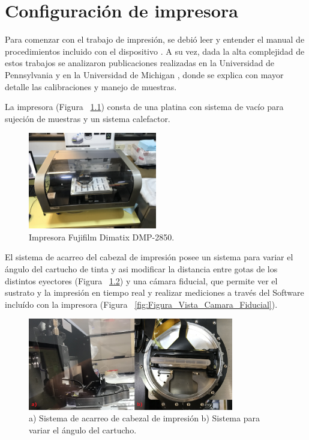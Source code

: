 \chapter{Configuración de impresora}\label{chap:apendiceA}
Para comenzar con el trabajo de impresión, se debió leer y entender el manual de procedimientos incluido con el dispositivo \cite{DimatixUM}. A su vez, dada la alta complejidad de estos trabajos se analizaron publicaciones realizadas en la Universidad de Pennsylvania \cite{UPenn} y en la Universidad de Michigan \cite{UMic}, donde se explica con mayor detalle las calibraciones y manejo de muestras.

La impresora (Figura ~\ref{fig:Figura_Impresora_DMP2850}) consta de una platina con sistema de vacío para sujeción de muestras y un sistema calefactor. 

\begin{figure}[H]
  \centering
    \includegraphics[width=0.5\textwidth]{Figuras/Figura_Impresora_DMP2850}
  \caption{Impresora Fujifilm Dimatix DMP-2850.}
  \label{fig:Figura_Impresora_DMP2850}
\end{figure}

El sistema de acarreo del cabezal de impresión posee un sistema para variar el ángulo del cartucho de tinta y asi modificar la distancia entre gotas de los distintos eyectores (Figura ~\ref{fig:Figura_Carriage_angulo}) y una cámara fiducial, que permite ver el sustrato y la impresión en tiempo real y realizar mediciones a través del Software incluído con la impresora (Figura ~\ref{fig:Figura_Vista_Camara_Fiducial}). 

\begin{figure}[H]
  \centering
    \includegraphics[width=0.8\textwidth]{Figuras/Figura_Carriage_angulo}
  \caption{a) Sistema de acarreo de cabezal de impresi\'on b) Sistema para variar el ángulo del cartucho.}
  \label{fig:Figura_Carriage_angulo}
\end{figure}

